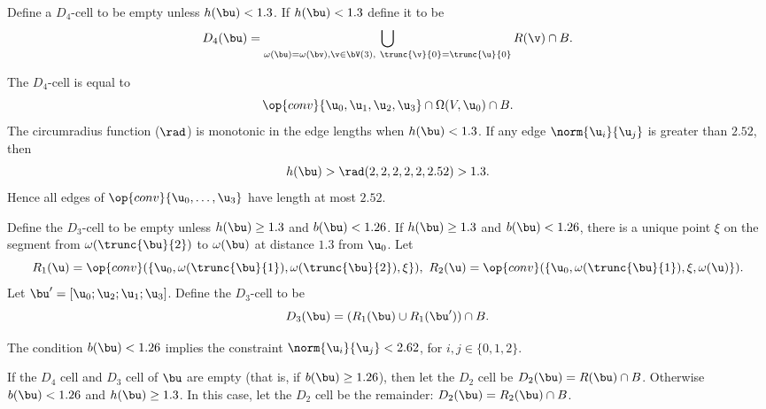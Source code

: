 \begin{definition}[$D_4$]
Define a $D_4$-cell to be empty unless $h(\bu)<1.3$.  If
$h(\bu)<1.3$ define it to be
\begin{displaymath}
D_4(\bu)=\bigcup_{\omega( \bu)=\omega(\bv),  \v\in  \bV(3),\ \trunc{\v}{0}= \trunc{\u}{0}}  R(\v)\cap B.
\end{displaymath}
%
\end{definition}

The $D_4$-cell is equal to
\begin{displaymath}
\op{conv}\{ \u_0, \u_1, \u_2, \u_3\} \cap \Omega(V, \u_0)\cap B.
\end{displaymath}
The circumradius function ($\rad$) is monotonic in the edge lengths when $h(\bu)<1.3$.  If
any edge $\norm{ \u_i}{ \u_j}$ is greater than $2.52$, then 
\begin{displaymath}
h(\bu) > \rad(2,2,2,2,2,2.52) > 1.3.
\end{displaymath}  
Hence all edges of $\op{conv}\{\u_0,\ldots,\u_3\}$ have
length at most $2.52$.

\begin{definition}[$D_3$]
Define the $D_3$-cell to be empty unless $h(\bu)\ge 1.3$ and
$b(\bu)< 1.26$.  If $h(\bu) \ge 1.3$ and $b(\bu)< 1.26$, there is a unique point $\xi$
on the segment from $\omega( \trunc{\bu}{2})$ to $\omega(\bu)$ at distance $1.3$ from $
\u_0$.  Let
\begin{displaymath}
R_1( \u) = \op{conv}(\{ \u_0,\omega( \trunc{\bu}{1}),\omega( \trunc{\bu}{2}),\xi\} ),\ 
R_2( \u) = \op{conv}(\{ \u_0,\omega( \trunc{\bu}{1}),\xi,\omega( \u)\} ).
\end{displaymath}
Let $ \bu' = [ \u_0; \u_2; \u_1; \u_3]$.
Define the $D_3$-cell to be
\begin{displaymath}
D_3(\bu) = (R_1( \bu) \cup R_1( \bu'))\cap B.
\end{displaymath}
\end{definition}

The condition $b(\bu)< 1.26$ implies the constraint $\norm{ \u_i}{ \u_j}<
2.62$, for $i,j\in\{0,1,2\}$.

\begin{definition}[$D_2$]
If the $D_4$ cell and $D_3$ cell of $\bu$ are empty (that is, if $b(\bu)\ge 1.26$), then
let the $D_2$ cell be $D_2(\bu)=R(\bu)\cap B$.  Otherwise $b(\bu)< 1.26$ and $h(\bu) \ge 1.3$.
In this case, let the $D_2$ cell be the remainder: $D_2(\bu)=R_2(\bu)\cap B$.
\end{definition}

